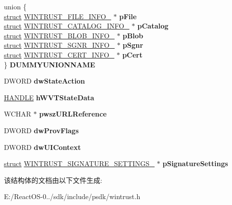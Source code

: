 \begin{DoxyCompactItemize}
\begin{tabbing}
union \{\\
\>\hyperlink{interfacestruct}{struct} \hyperlink{struct_w_i_n_t_r_u_s_t___f_i_l_e___i_n_f_o__}{WINTRUST\_FILE\_INFO\_} $\ast$ {\bfseries pFile}\\
\>\hyperlink{interfacestruct}{struct} \hyperlink{struct_w_i_n_t_r_u_s_t___c_a_t_a_l_o_g___i_n_f_o__}{WINTRUST\_CATALOG\_INFO\_} $\ast$ {\bfseries pCatalog}\\
\>\hyperlink{interfacestruct}{struct} \hyperlink{struct_w_i_n_t_r_u_s_t___b_l_o_b___i_n_f_o__}{WINTRUST\_BLOB\_INFO\_} $\ast$ {\bfseries pBlob}\\
\>\hyperlink{interfacestruct}{struct} \hyperlink{struct_w_i_n_t_r_u_s_t___s_g_n_r___i_n_f_o__}{WINTRUST\_SGNR\_INFO\_} $\ast$ {\bfseries pSgnr}\\
\>\hyperlink{interfacestruct}{struct} \hyperlink{struct_w_i_n_t_r_u_s_t___c_e_r_t___i_n_f_o__}{WINTRUST\_CERT\_INFO\_} $\ast$ {\bfseries pCert}\\
\} {\bfseries DUMMYUNIONNAME}\\

\end{tabbing}\item 
\mbox{\label{struct___w_i_n_t_r_u_s_t___d_a_t_a_a7505debe726e6c1fe379bf58ba4c47ca}} 
D\+W\+O\+RD {\bfseries dw\+State\+Action}
\item 
\mbox{\label{struct___w_i_n_t_r_u_s_t___d_a_t_a_a80c5f447fda8de6278d3cda6bf64ae71}} 
\hyperlink{interfacevoid}{H\+A\+N\+D\+LE} {\bfseries h\+W\+V\+T\+State\+Data}
\item 
\mbox{\label{struct___w_i_n_t_r_u_s_t___d_a_t_a_aef792d1a3b379f2fa9495374e853b914}} 
W\+C\+H\+AR $\ast$ {\bfseries pwsz\+U\+R\+L\+Reference}
\item 
\mbox{\label{struct___w_i_n_t_r_u_s_t___d_a_t_a_a6e1b14851b8ddab2769c428067f5765c}} 
D\+W\+O\+RD {\bfseries dw\+Prov\+Flags}
\item 
\mbox{\label{struct___w_i_n_t_r_u_s_t___d_a_t_a_a4393719adffd2b304b702d9684b22f0a}} 
D\+W\+O\+RD {\bfseries dw\+U\+I\+Context}
\item 
\mbox{\label{struct___w_i_n_t_r_u_s_t___d_a_t_a_a2784beabb07465ff15a4aa96bf669431}} 
\hyperlink{interfacestruct}{struct} \hyperlink{struct_w_i_n_t_r_u_s_t___s_i_g_n_a_t_u_r_e___s_e_t_t_i_n_g_s__}{W\+I\+N\+T\+R\+U\+S\+T\+\_\+\+S\+I\+G\+N\+A\+T\+U\+R\+E\+\_\+\+S\+E\+T\+T\+I\+N\+G\+S\+\_\+} $\ast$ {\bfseries p\+Signature\+Settings}
\end{DoxyCompactItemize}


该结构体的文档由以下文件生成\+:\begin{DoxyCompactItemize}
\item 
E\+:/\+React\+O\+S-\/0../sdk/include/psdk/wintrust.\+h\end{DoxyCompactItemize}
